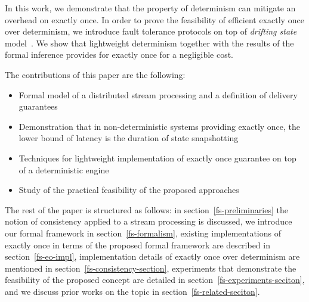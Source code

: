 In this work, we demonstrate that the property of determinism can mitigate an overhead on exactly once. 
In order to prove the feasibility of efficient exactly once over determinism, we introduce  fault tolerance protocols on top of {\em drifting state} model~\cite{we2018adbis}. 
We show that lightweight determinism together with the results of the formal inference provides for  exactly once for a negligible  cost.

The contributions of this paper are the following: 
\begin{itemize}
    \item Formal model of a distributed stream processing  and   a   definition of  delivery guarantees 
    \item Demonstration that in non-deterministic systems providing exactly once, the lower bound of latency is the duration of state snapshotting
    \item Techniques for lightweight implementation of exactly once guarantee on top of a deterministic engine
    \item Study of the practical feasibility of the proposed approaches
\end{itemize}

The rest of the paper is structured as follows: 
in section~\ref{fs-preliminaries} the notion of consistency applied to a stream processing is discussed, 
we introduce our formal framework in section~\ref{fs-formalism}, 
existing implementations of exactly once in terms of the proposed formal framework are described in section~\ref{fs-eo-impl}, 
implementation details of exactly once over determinism are mentioned in section~\ref{fs-consistency-section}, 
experiments that demonstrate the feasibility of the proposed concept are detailed in section~\ref{fs-experiments-seciton}, 
and we discuss prior works on the topic in section~\ref{fs-related-seciton}. 
